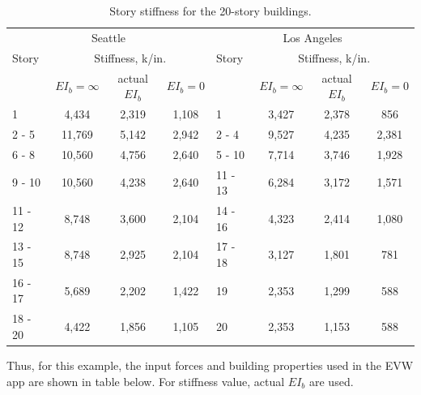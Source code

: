 \documentclass[onecolumn, fleqn]{article}
\begin{document}
\begin{table}[H]
	\centering \caption{Story stiffness for the 20-story buildings.}
	\label{tab:stiffness_20LASE}
	\begin{tabular}{lccclccc}
	\toprule
	\multicolumn{4}{c}{Seattle}						& \multicolumn{4}{c}{Los Angeles}				\\ \cmidrule(rl){1-4}\cmidrule(rl){5-8}
	Story	& \multicolumn{3}{c}{Stiffness, k/in.}						& Story		& \multicolumn{3}{c}{Stiffness, k/in.}				\\ \cmidrule(rl){2-4}\cmidrule(rl){6-8}
			& $EI_b = \infty$	& actual $EI_b$		& $EI_b = 0$		& 			& $EI_b = \infty$	& actual $EI_b$		& $EI_b = 0$\\ \cmidrule(rl){1-4}\cmidrule(rl){5-8}
	1 		& 4,434				& 2,319				& 1,108				& 1 		& 3,427				& 2,378				& 856				\\
	2 - 5	& 11,769			& 5,142				& 2,942				& 2 - 4		& 9,527				& 4,235				& 2,381				\\ 
	6 - 8	& 10,560			& 4,756				& 2,640				& 5 - 10	& 7,714				& 3,746				& 1,928				\\ 
	9 - 10	& 10,560			& 4,238				& 2,640				& 11 - 13	& 6,284				& 3,172				& 1,571				\\ 
	11 - 12	& 8,748				& 3,600				& 2,104				& 14 - 16	& 4,323				& 2,414				& 1,080				\\ 
	13 - 15	& 8,748				& 2,925				& 2,104				& 17 - 18	& 3,127				& 1,801				& 781				\\ 
	16 - 17	& 5,689				& 2,202				& 1,422				& 19		& 2,353				& 1,299				& 588				\\ 
	18 - 20	& 4,422				& 1,856				& 1,105				& 20		& 2,353				& 1,153				& 588				\\ \bottomrule
	\end{tabular}
\end{table}


Thus, for this example, the input forces and building properties used in the EVW app are shown in table below. For stiffness value, actual $EI_b$ are used.
\end{document}
